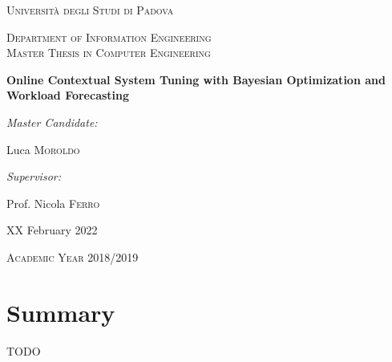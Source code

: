 \documentclass[a4paper, 12pt]{article} %
\begin{document}
	
	\begin{titlepage}
		\centering
		\vspace*{1cm}
		{\par \scshape\LARGE Università degli Studi di Padova \par}
		\vspace{1cm}
		{\scshape\Large Department of Information Engineering\\Master Thesis in Computer Engineering\par}
		\vspace{1.5cm}
		{\huge\bfseries Online Contextual System Tuning with Bayesian Optimization and Workload Forecasting\par}
		\vspace{2cm}
		{ \large \itshape Master Candidate:}
		{ \large Luca \textsc{Moroldo} \par}
		\vspace{0.7cm}
		{ \large \itshape Supervisor:}
		{ \large Prof. Nicola \textsc{Ferro} \par}
		\vfill
		
		{ \large XX February 2022 \par}
		{ \large \textsc{Academic Year 2018/2019}\par}
	\end{titlepage}
	
	\clearpage%
	\thispagestyle{empty}%
	\addtocounter{page}{-1}%
	\null%
	\clearpage
	
	\newpage
	\thispagestyle{plain}
	\section*{Summary}
	
	TODO
	
	
	\clearpage%
	\thispagestyle{empty}%
	\addtocounter{page}{-1}%
	\null%
	\clearpage
	
	\renewcommand{\contentsname}{Index}
	\newpage
	\thispagestyle{plain}
	\tableofcontents

	\clearpage%
	\thispagestyle{empty}%
	\addtocounter{page}{-1}%
	\null%
	\clearpage
	
	
	
	\newpage
	
\end{document}

